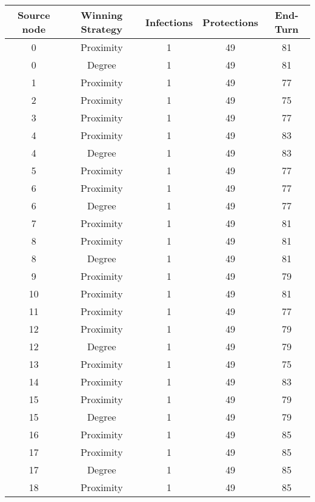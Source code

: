 \documentclass[results.tex]{subfiles}
\begin{document}
\begin{center}
  \begin{tabular}{| c || c | c | c | c |}
    \hline
    {\bfseries Source node} & {\bfseries Winning Strategy} & {\bfseries Infections} & {\bfseries Protections} & {\bfseries End-Turn} \\  %
    \hline\hline
    0 & Proximity & 1 & 49 & 81 \\ 
    \hline
    0 & Degree & 1 & 49 & 81 \\ 
    \hline
    1 & Proximity & 1 & 49 & 77 \\ 
    \hline
    2 & Proximity & 1 & 49 & 75 \\ 
    \hline
    3 & Proximity & 1 & 49 & 77 \\ 
    \hline
    4 & Proximity & 1 & 49 & 83 \\ 
    \hline
    4 & Degree & 1 & 49 & 83 \\ 
    \hline
    5 & Proximity & 1 & 49 & 77 \\ 
    \hline
    6 & Proximity & 1 & 49 & 77 \\ 
    \hline
    6 & Degree & 1 & 49 & 77 \\ 
    \hline
    7 & Proximity & 1 & 49 & 81 \\ 
    \hline
    8 & Proximity & 1 & 49 & 81 \\ 
    \hline
    8 & Degree & 1 & 49 & 81 \\ 
    \hline
    9 & Proximity & 1 & 49 & 79 \\ 
    \hline
    10 & Proximity & 1 & 49 & 81 \\ 
    \hline
    11 & Proximity & 1 & 49 & 77 \\ 
    \hline
    12 & Proximity & 1 & 49 & 79 \\ 
    \hline
    12 & Degree & 1 & 49 & 79 \\ 
    \hline
    13 & Proximity & 1 & 49 & 75 \\ 
    \hline
    14 & Proximity & 1 & 49 & 83 \\ 
    \hline
    15 & Proximity & 1 & 49 & 79 \\ 
    \hline
    15 & Degree & 1 & 49 & 79 \\ 
    \hline
    16 & Proximity & 1 & 49 & 85 \\ 
    \hline
    17 & Proximity & 1 & 49 & 85 \\ 
    \hline
    17 & Degree & 1 & 49 & 85 \\ 
    \hline
    18 & Proximity & 1 & 49 & 85 \\ 
    \hline

\end{tabular}
\end{center}
\end{document}
